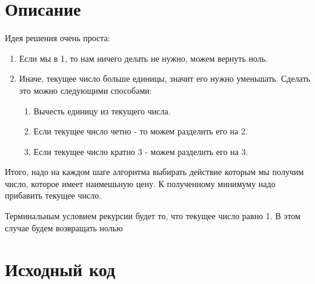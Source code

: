 \section{Описание}

Идея решения очень проста:
\begin{enumerate} 
    \item Если мы в 1, то нам ничего делать не нужно, можем вернуть ноль.
    \item Иначе, текущее число больше единицы, значит его нужно уменьшать. Сделать это можно следующими способами:
        \begin{enumerate} 
            \item Вычесть единицу из текущего числа.
            \item Если текущее число четно - то можем разделить его на 2.
            \item Если текущее число кратно 3 - можем разделить его на 3.
        \end{enumerate}
\end{enumerate}

Итого, надо на каждом шаге алгоритма выбирать действие которым мы получим число, которое имеет наимешьную цену. К полученному минимуму надо прибавить текущее число.

Терминальным условием рекурсии будет то, что текущее число равно 1. В этом случае будем возвращать нолью

\pagebreak

\section{Исходный код}

